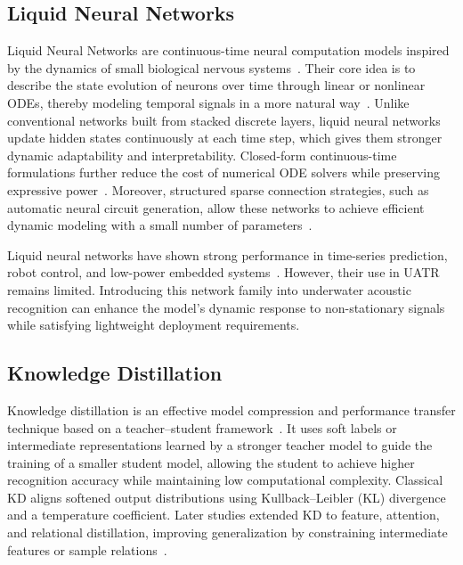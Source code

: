 ﻿\documentclass[lettersize,journal]{IEEEtran}
\begin{document}
\subsection{Liquid Neural Networks}
Liquid Neural Networks are continuous-time neural computation models inspired by the dynamics of small biological nervous systems~\cite{Hasani2021LTC}. Their core idea is to describe the state evolution of neurons over time through linear or nonlinear ODEs, thereby modeling temporal signals in a more natural way~\cite{Chen2018NeuralODE}. Unlike conventional networks built from stacked discrete layers, liquid neural networks update hidden states continuously at each time step, which gives them stronger dynamic adaptability and interpretability. Closed-form continuous-time formulations further reduce the cost of numerical ODE solvers while preserving expressive power~\cite{Hasani2022CfC}. Moreover, structured sparse connection strategies, such as automatic neural circuit generation, allow these networks to achieve efficient dynamic modeling with a small number of parameters~\cite{Lechner2020NCP}.

Liquid neural networks have shown strong performance in time-series prediction, robot control, and low-power embedded systems~\cite{Lechner2020NCP,Hasani2021LTC,Hasani2022CfC}. However, their use in UATR remains limited. Introducing this network family into underwater acoustic recognition can enhance the model's dynamic response to non-stationary signals while satisfying lightweight deployment requirements.

\subsection{Knowledge Distillation}
Knowledge distillation is an effective model compression and performance transfer technique based on a teacher--student framework~\cite{Bucila2006Compression,Hinton2015Distilling,Gou2021KDSurvey}. It uses soft labels or intermediate representations learned by a stronger teacher model to guide the training of a smaller student model, allowing the student to achieve higher recognition accuracy while maintaining low computational complexity. Classical KD aligns softened output distributions using Kullback--Leibler (KL) divergence and a temperature coefficient. Later studies extended KD to feature, attention, and relational distillation, improving generalization by constraining intermediate features or sample relations~\cite{Romero2015FitNets,Zagoruyko2017AT,Park2019RKD}.
\end{document}
